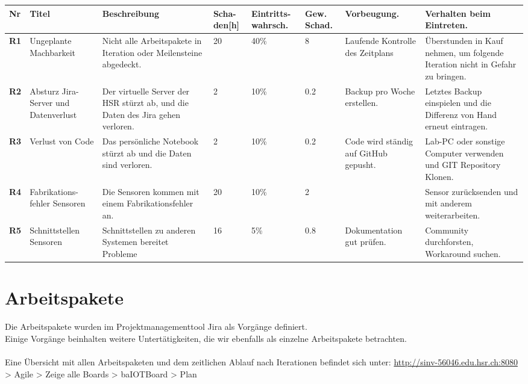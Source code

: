 \begin{landscape}
	\begin{tabularx}{\linewidth}{lp{2cm}Xp{1cm}p{1.5cm}p{1.5cm}XX}
	\textbf{Nr}	& \textbf{Titel} & \textbf{Beschreibung} & \textbf{Scha-den[h]} & \textbf{Eintritts-wahrsch.} & \textbf{Gew. Schad.} & \textbf{Vorbeugung.} & \textbf{Verhalten beim Eintreten.}\\
	\hline
	\textbf{R1} & Ungeplante Machbarkeit	& Nicht alle Arbeitspakete in Iteration oder Meilensteine abgedeckt.	& 20 & 40\% & 8 & Laufende Kontrolle des Zeitplans & Überstunden in Kauf nehmen, um folgende Iteration nicht in Gefahr zu bringen. \\ \hline
	\textbf{R2} & Absturz Jira-Server und Datenverlust	& Der virtuelle Server der HSR stürzt ab, und die Daten des Jira gehen verloren. & 2 & 10\% & 0.2 & Backup pro Woche erstellen. & Letztes Backup einspielen und die Differenz von Hand erneut eintragen. \\ \hline
	\textbf{R3} & Verlust von Code & Das persönliche Notebook stürzt ab und die Daten sind verloren. & 2 & 10\% & 0.2 & Code wird ständig auf GitHub gepusht. & Lab-PC oder sonstige Computer verwenden und GIT Repository Klonen. \\ \hline
	\textbf{R4} & Fabrikations-fehler Sensoren & Die Sensoren kommen mit einem Fabrikationsfehler an. & 20 & 10\% & 2 & & Sensor zurücksenden und mit anderem weiterarbeiten. \\ \hline
	\textbf{R5} & Schnittstellen Sensoren & Schnittstellen zu anderen Systemen bereitet Probleme & 16 & 5\% & 0.8 & Dokumentation gut prüfen. & Community durchforsten, Workaround suchen. \\ \hline
\end{tabularx}
\end{landscape}

\section*{Arbeitspakete}
Die Arbeitspakete wurden im Projektmanagementtool Jira als Vorgänge definiert. \\
Einige Vorgänge beinhalten weitere Untertätigkeiten, die wir ebenfalls als einzelne Arbeitspakete betrachten. \\
\\
Eine Übersicht mit allen Arbeitspaketen und dem zeitlichen Ablauf nach Iterationen befindet sich unter: \url{http://sinv-56046.edu.hsr.ch:8080} > Agile > Zeige alle Boards > baIOTBoard > Plan

